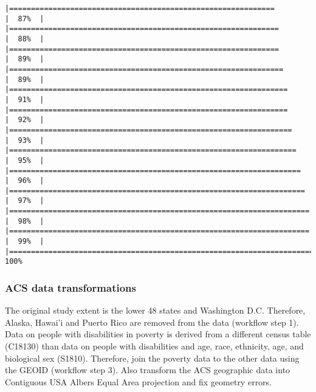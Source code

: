 \documentclass[
]{article}
\begin{document}
\begin{verbatim}
|=============================================================         |  87%  |                                                                              |==============================================================        |  88%  |                                                                              |==============================================================        |  89%  |                                                                              |===============================================================       |  89%  |                                                                              |================================================================      |  91%  |                                                                              |================================================================      |  92%  |                                                                              |=================================================================     |  93%  |                                                                              |==================================================================    |  95%  |                                                                              |===================================================================   |  96%  |                                                                              |====================================================================  |  97%  |                                                                              |===================================================================== |  98%  |                                                                              |===================================================================== |  99%  |                                                                              |======================================================================| 100%
\end{verbatim}

\hypertarget{acs-data-transformations}{%
\subsubsection{ACS data
transformations}\label{acs-data-transformations}}

The original study extent is the lower 48 states and Washington D.C.
Therefore, Alaska, Hawai'i and Puerto Rico are removed from the data
(workflow step 1). Data on people with disabilities in poverty is
derived from a different census table (C18130) than data on people with
disabilities and age, race, ethnicity, age, and biological sex (S1810).
Therefore, join the poverty data to the other data using the GEOID
(workflow step 3). Also transform the ACS geographic data into
Contiguous USA Albers Equal Area projection and fix geometry errors.
\end{document}
